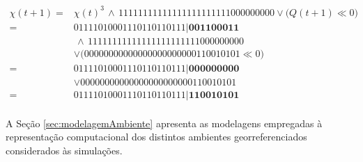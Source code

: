 \begin{equation}
 \begin{split}
 \chi(t + 1)   = & \chi(t)^3 \, \wedge \, 11111111111111111111111000000000 \vee \big(Q(t + 1) \ll 0\big) \\
	       = & 0 1 1 1 1 0 1 0 0 0 1 1 1 0 1 1 0 1 1 0 1 1 1 | \boldsymbol{0 0 1 1 0 0 0 1 1} \\ 
	         & \, \wedge \, 11111111111111111111111000000000 \\
	         & \vee \big(00000000000000000000000110010101 \ll 0\big) \\
	       = & 0 1 1 1 1 0 1 0 0 0 1 1 1 0 1 1 0 1 1 0 1 1 1 | \boldsymbol{0 0 0 0 0 0 0 0 0} \\ 
	         & \vee 00000000000000000000000110010101 \\
	       = & 0 1 1 1 1 0 1 0 0 0 1 1 1 0 1 1 0 1 1 0 1 1 1 | \boldsymbol{1 1 0 0 1 0 1 0 1} \\
 \label{eq:setQH}
 \end{split}
\end{equation}

A Seção \ref{sec:modelagemAmbiente} apresenta as modelagens empregadas à representação computacional dos distintos ambientes georreferenciados considerados às simulações.

\newpage
